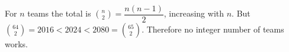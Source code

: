 For $n$ teams the total is $\binom n2=\dfrac{n(n-1)}{2}$, increasing with $n$. But $\binom{64}{2}=2016<2024<2080=\binom{65}{2}$. Therefore $\boxed{\text{no}}$ integer number of teams works.
